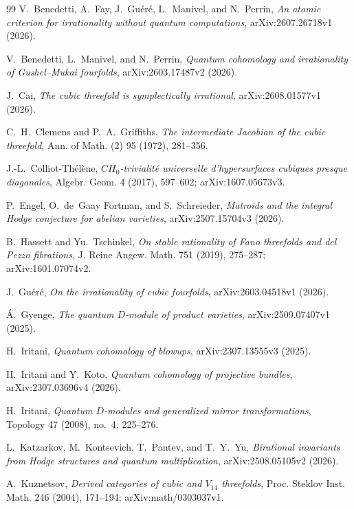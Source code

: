\documentclass[11pt]{article}
\numberwithin{equation}{section}
\theoremstyle{definition}
\theoremstyle{remark}
\begin{document}
\begin{thebibliography}{99}
V.~Benedetti, A.~Fay, J.~Gu\'er\'e, L.~Manivel, and N.~Perrin,
\emph{An atomic criterion for irrationality without quantum computations},
arXiv:2607.26718v1 (2026).

V.~Benedetti, L.~Manivel, and N.~Perrin,
\emph{Quantum cohomology and irrationality of Gushel--Mukai fourfolds},
arXiv:2603.17487v2 (2026).

J.~Cai,
\emph{The cubic threefold is symplectically irrational},
arXiv:2608.01577v1 (2026).

C.~H.~Clemens and P.~A.~Griffiths,
\emph{The intermediate Jacobian of the cubic threefold},
Ann. of Math. (2) 95 (1972), 281--356.


J.-L.~Colliot-Th\'el\`ene,
\emph{\(CH_0\)-trivialit\'e universelle d'hypersurfaces cubiques presque
diagonales}, Algebr. Geom. 4 (2017), 597--602; arXiv:1607.05673v3.

P.~Engel, O.~de~Gaay Fortman, and S.~Schreieder,
\emph{Matroids and the integral Hodge conjecture for abelian varieties},
arXiv:2507.15704v3 (2026).

B.~Hassett and Yu.~Tschinkel,
\emph{On stable rationality of Fano threefolds and del Pezzo fibrations},
J. Reine Angew. Math. 751 (2019), 275--287;
arXiv:1601.07074v2.

J.~Gu\'er\'e,
\emph{On the irrationality of cubic fourfolds},
arXiv:2603.04518v1 (2026).

\'A.~Gyenge,
\emph{The quantum \(D\)-module of product varieties},
arXiv:2509.07407v1 (2025).

H.~Iritani,
\emph{Quantum cohomology of blowups},
arXiv:2307.13555v3 (2025).

H.~Iritani and Y.~Koto,
\emph{Quantum cohomology of projective bundles},
arXiv:2307.03696v4 (2026).

H.~Iritani,
\emph{Quantum \(D\)-modules and generalized mirror transformations},
Topology 47 (2008), no.~4, 225--276.

L.~Katzarkov, M.~Kontsevich, T.~Pantev, and T.~Y.~Yu,
\emph{Birational invariants from Hodge structures and quantum
multiplication}, arXiv:2508.05105v2 (2026).

A.~Kuznetsov,
\emph{Derived categories of cubic and \(V_{14}\) threefolds},
Proc. Steklov Inst. Math. 246 (2004), 171--194;
arXiv:math/0303037v1.


\end{thebibliography}
\end{document}
